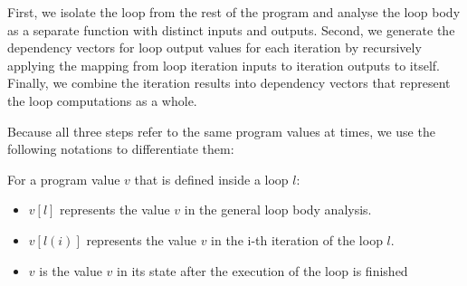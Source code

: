 First, we isolate the loop from the rest of the program and analyse the loop body as a separate function with distinct inputs and outputs. Second, we generate the dependency vectors for loop output values for each iteration by recursively applying the mapping from loop iteration inputs to iteration outputs to itself. Finally, we combine the iteration results into dependency vectors that represent the loop computations as a whole.

Because all three steps refer to the same program values at times, we use the following notations to differentiate them:

For a program value $v$ that is defined inside a loop $l$:
\begin{itemize}
    \setlength\itemsep{0em}
    \item $v[l]$ represents the value $v$ in the general loop body analysis.
    \item $v[l(i)]$ represents the value $v$ in the i-th iteration of the loop $l$.
    \item $v$ is the value $v$ in its state after the execution of the loop is finished
\end{itemize}

